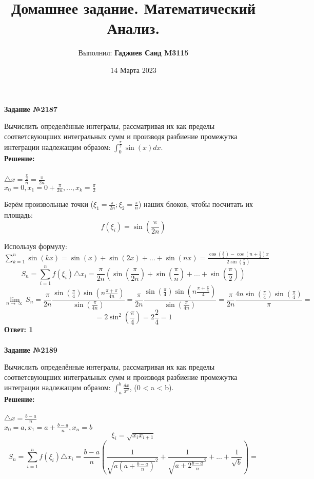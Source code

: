 \documentclass{article}
\title{Домашнее задание. Математический Анализ.}
\author{Выполнил: \textbf{Гаджиев Саид M3115}}
\date{14 Марта 2023}
\begin{document}
\maketitle

\textbf{Задание №2187}
\par{Вычислить определённые интегралы, рассматривая их как пределы соответсвующших интегральных сумм и производя разбиение промежутка интеграции надлежащим образом: $\int_{0}^{\frac{\pi}{2}}\sin(x)dx$.}\\
\textbf{Решение:}\\\\
$\triangle x = \frac{\frac{\pi}{2}}{n} = \frac{\pi}{2n}$\\
$x_{0} = 0, x_{1} = 0 + \frac{\pi}{2n}, ..., x_{k} = \frac{\pi}{2}$\\
\par{Берём произвольные точки ($\xi_{1} = \frac{\pi}{2n}; \xi_{2} = \frac{\pi}{n}$) наших блоков, чтобы посчитать их площадь:}
$$f(\xi_{i}) = \sin(\frac{\pi}{2n})$$
\par{Используя формулу: $\sum_{k=1}^{n} \sin(kx) = \sin(x)+\sin(2x)+...+\sin(nx) = \frac{\cos(\frac{x}{2})-\cos(n+\frac{1}{2})x}{2\sin(\frac{x}{2})}$}
$$S_{n} = \sum_{i=1}^{n} f(\xi_{i})\triangle x_{i} = \frac{\pi}{2n} (\sin(\frac{\pi}{2n}) + \sin(\frac{\pi}{n}) + ... + \sin(\frac{\pi}{2}))$$
$$\lim_{n \rightarrow \propto}S_{n} = \frac{\pi}{2n}\frac{\sin(\frac{\pi}{4})\sin(n\frac{\pi+\pi}{4n})}{\sin(\frac{\pi}{4n})} = \frac{\pi}{2n}\frac{\sin(\frac{\pi}{4})\sin(n\frac{\pi+\frac{\pi}{n}}{4})}{\sin(\frac{\pi}{4n})} = \frac{\pi}{2n}\frac{4n\sin(\frac{\pi}{4})\sin(\frac{\pi}{4})}{\pi} =$$
$$= 2\sin^{2}(\frac{\pi}{4}) = 2\frac{2}{4} = 1$$
\textbf{Ответ: 1}
\\\\
\textbf{Задание №2189}
\par{Вычислить определённые интегралы, рассматривая их как пределы соответсвующших интегральных сумм и производя разбиение промежутка интеграции надлежащим образом: $\int_{a}^{b}\frac{dx}{x^{2}}$, (0 < a < b).}\\
\textbf{Решение:}\\\\
$\triangle x = \frac{b-a}{n}$\\
$x_{0} = a, x_{1} = a + \frac{b-a}{n}, x_{n} = b$\\
$$\xi_{i} = \sqrt{x_{i}x_{i+1}}$$
$$S_{n} = \sum_{i=1}^{n} f(\xi_{i})\triangle x_{i} = \frac{b-a}{n}(\frac{1}{{\sqrt{a(a+\frac{b-a}{n})}}^{2}} + \frac{1}{{\sqrt{a+2\frac{b-a}{n}}}^{2}} + ... + \frac{1}{\sqrt{b}}) =$$
\end{document}
